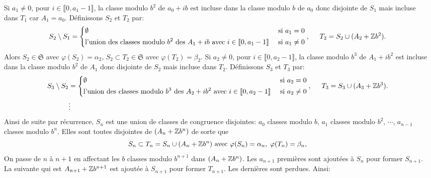 \begin{demo}
Si $a_1\neq 0$, pour $i \in \llbracket 0, a_1-1\rrbracket$, la classe modulo $b^2$ de $a_0 + ib$ est incluse dans la classe modulo $b$ de $a_0$ donc disjointe de $S_1$ mais incluse dans $T_1$ car $A_1 = a_0$. Définissons $S_2$ et $T_2$ par:
\begin{displaymath}
 S_2 \setminus S_1 = \left\lbrace
   \begin{aligned}
   & \emptyset &\text{ si } a_1 = 0 \\
   &\text{l'union des classes modulo } b^2 \text{ des } A_1 + ib \text{ avec }i \in \llbracket 0, a_1-1\rrbracket &\text{ si } a_1 \neq 0
   \end{aligned}
   \right., \hspace{0.5cm} T_2 = S_2 \cup (A_2 + \mathbb{Z} b^2).
\end{displaymath}
Alors $S_2 \in \mathfrak{S}$ avec $\varphi(S_2) = \alpha_2$, $S_2 \subset T_2 \in \mathfrak{S}$ avec $\varphi(T_2) = \beta_2$.\newline
Si $a_2\neq 0$, pour $i \in \llbracket 0, a_2 - 1\rrbracket$, la classe modulo $b^3$ de $A_1 + ib^2$ est incluse dans la classe modulo $b^2$ de $A_1$ donc disjointe de $S_2$ mais incluse dans $T_2$. Définissons $S_3$ et $T_3$ par:
\begin{align*}
 S_3 \setminus S_2 &= \left\lbrace
   \begin{aligned}
   & \emptyset &\text{ si } a_2 = 0 \\
   &\text{l'union des classes modulo } b^3 \text{ des } A_2 + ib^2 \text{ avec }i \in \llbracket 0, a_2-1\rrbracket &\text{ si } a_2 \neq 0
   \end{aligned}
   \right. , \hspace{0.5cm} T_3 = S_3 \cup (A_3 + \mathbb{Z} b^3).\\
   & \vdots
\end{align*}
Ainsi de suite par récurrence, $S_n$ est une union de classes de congruence disjointes: $a_0$ classes modulo $b$, $a_1$ classes modulo $b^2$, $\cdots$, $a_{n-1}$ classes modulo $b^n$. Elles sont toutes disjointes de $(A_n + \mathbb{Z} b^n)$ de sorte que
\begin{displaymath}
 S_n \subset T_n = S_n \cup (A_n + \mathbb{Z} b^n) \text{ avec } \varphi(S_n) = \alpha_n, \; \varphi(T_n) = \beta_n,
\end{displaymath}
On passe de $n$ à $n+1$ en affectant les $b$ classes modulo $b^{n+1}$ dans $(A_n + \mathbb{Z} b^n)$. Les $a_{n+1}$ premières sont ajoutées à $S_n$ pour former $S_{n+1}$. La suivante qui est $A_{n+1} + \mathbb{Z} b^{n+1}$ est ajoutée à $S_{n+1}$ pour former $T_{n+1}$. Les dernières sont perdues. Ainsi:

\end{demo}
